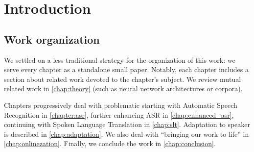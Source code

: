\chapter*{Introduction}

\section*{Work organization}
We settled on a less traditional strategy for the organization of this work: we serve every chapter as a standalone small paper. Notably, each chapter includes a section about related work devoted to the chapter's subject. We review mutual related work in \cref{chap:theory} (such as neural network architectures or corpora).

Chapters progressively deal with problematic starting with Automatic Speech Recognition in \cref{chapter:asr}, further enhancing ASR in \cref{chap:enhanced_asr}, continuing with Spoken Language Translation in \cref{chap:slt}. Adaptation to speaker is described in \cref{chap:adaptation}. We also deal with ``bringing our work to life'' in \cref{chap:onlinezation}. Finally, we conclude the work in \cref{chap:conclusion}.
